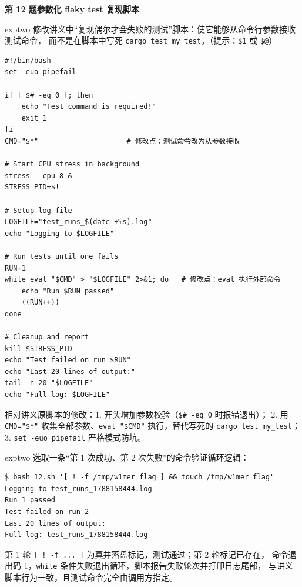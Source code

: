 \documentclass[11pt,a4paper,fontset=none]{ctexart}
\newcommand{\hwbanner}[3]{%
  \par\vspace{1.1em}
  \begin{tcolorbox}[enhanced, colback=#1!8, colframe=#1!75!black,
    boxrule=0.8pt, arc=2pt, left=7pt, right=7pt, top=4pt, bottom=4pt,
    before skip=1.1em]
    {\bfseries\color{#1!75!black}#2\qquad #3}
  \end{tcolorbox}
  \par\vspace{0.1em}\noindent\ignorespaces
}
\newcommand{\sublabel}[2]{%
  \par\vspace{0.8em}\noindent{\bfseries\color{#1!75!black}#2}\par\nobreak\vspace{0.25em}\noindent\ignorespaces
}
\begin{document}
\hwbanner{exptwo}{第 12 题}{参数化 flaky test 复现脚本}
\begin{reqbox}{exptwo}
  修改讲义中“复现偶尔才会失败的测试”脚本：使它能够从命令行参数接收测试命令，
  而不是在脚本中写死 \texttt{cargo test my\_test}。（提示：\texttt{\$1} 或 \texttt{\$@}）
\end{reqbox}
\sublabel{exptwo}{\faCode\ 解答（\texttt{12.sh}）}
\begin{lstlisting}[style=shell]
#!/bin/bash
set -euo pipefail

if [ $# -eq 0 ]; then
    echo "Test command is required!"
    exit 1
fi
CMD="$*"                     # 修改点：测试命令改为从参数接收

# Start CPU stress in background
stress --cpu 8 &
STRESS_PID=$!

# Setup log file
LOGFILE="test_runs_$(date +%s).log"
echo "Logging to $LOGFILE"

# Run tests until one fails
RUN=1
while eval "$CMD" > "$LOGFILE" 2>&1; do   # 修改点：eval 执行外部命令
    echo "Run $RUN passed"
    ((RUN++))
done

# Cleanup and report
kill $STRESS_PID
echo "Test failed on run $RUN"
echo "Last 20 lines of output:"
tail -n 20 "$LOGFILE"
echo "Full log: $LOGFILE"
\end{lstlisting}
相对讲义原脚本的修改：1. 开头增加参数校验（\texttt{\$\# -eq 0} 时报错退出）；
2. 用 \texttt{CMD="\$*"} 收集全部参数、\texttt{eval "\$CMD"} 执行，替代写死的
\texttt{cargo test my\_test}；3. \texttt{set -euo pipefail} 严格模式防坑。
\begin{resbox}{exptwo}
选取一条“第 1 次成功、第 2 次失败”的命令验证循环逻辑：
\begin{lstlisting}[style=output]
$ bash 12.sh '[ ! -f /tmp/w1mer_flag ] && touch /tmp/w1mer_flag'
Logging to test_runs_1788158444.log
Run 1 passed
Test failed on run 2
Last 20 lines of output:
Full log: test_runs_1788158444.log
\end{lstlisting}
第 1 轮 \texttt{[ ! -f ... ]} 为真并落盘标记，测试通过；第 2 轮标记已存在，
命令退出码 1，\texttt{while} 条件失败退出循环，脚本报告失败轮次并打印日志尾部，
与讲义脚本行为一致，且测试命令完全由调用方指定。
\end{resbox}
\end{document}
